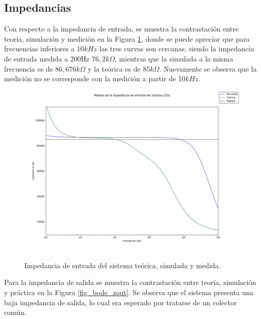 \subsection{Impedancias}
Con respecto a la impedancia de entrada, se muestra la contrastación entre teoría, simulación y medición en la Figura \ref{fig_bode_zin}, donde se puede apreciar que para frecuencias inferiores a 10$kHz$ las tres curvas son cercanas, siendo la impedancia de entrada medida a 200Hz $76,2k\Omega$, mientras que la simulada a la misma frecuencia es de $86,676k\Omega$ y la teórica es de $85k\Omega$. Nuevamente se observa que la medición no se corresponde con la medición a partir de 10$kHz$.

		\begin{figure}[H]
			\centering
			\includegraphics[scale=0.4]{./Imagenes/Modulo_zin.png} \\
			\caption{Impedancia de entrada del sistema teórica, simulada y medida.}
			\label{fig_bode_zin}
		\end{figure}

Para la impedancia de salida se muestra la contrastación entre teoría, simulación y práctica en la Figura \ref{fig_bode_zout}. Se observa que el sistema presenta una baja impedancia de salida, lo cual era esperado por tratarse de un colector común. 


